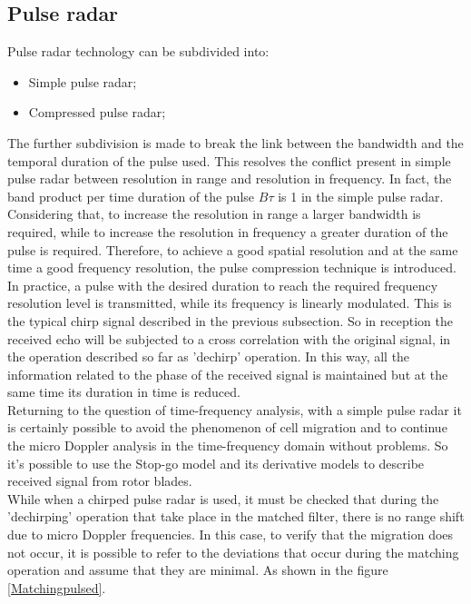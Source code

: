 \subsection{Pulse radar}
Pulse radar technology can be subdivided into: 
\begin{itemize}
    \item Simple pulse radar;
    
    \item Compressed pulse radar;
\end{itemize}
The further subdivision is made to break the link between the bandwidth and the temporal duration of the pulse used. This resolves the conflict present in simple pulse radar between resolution in range and resolution in frequency. In fact, the band product per time duration of the pulse $ B \tau $ is 1 in the simple pulse radar. Considering that, to increase the resolution in range a larger bandwidth is required, while to increase the resolution in frequency a greater duration of the pulse is required. Therefore, to achieve a good spatial resolution and at the same time a good frequency resolution, the pulse compression technique is introduced. In practice, a pulse with the desired duration to reach the required frequency resolution level is transmitted, while its frequency is linearly modulated. This is the typical chirp signal described in the previous subsection. So in reception the received echo will be subjected to a cross correlation with the original signal, in the operation described so far as 'dechirp' operation. In this way, all the information related to the phase of the received signal is maintained but at the same time its duration in time is reduced.\\
Returning to the question of time-frequency analysis, with a simple pulse radar it is certainly possible to avoid the phenomenon of cell migration and to continue the micro Doppler analysis in the time-frequency domain without problems. So it's possible to use the Stop-go model and its derivative models to describe received signal from rotor blades.\\
While when a chirped pulse radar is used, it must be checked that during the 'dechirping' operation that take place in the matched filter, there is no range shift due to micro Doppler frequencies. In this case, to verify that the migration does not occur, it is possible to refer to the deviations that occur during the matching operation and assume that they are minimal. As shown in the figure  \ref{Matchingpulsed}.

